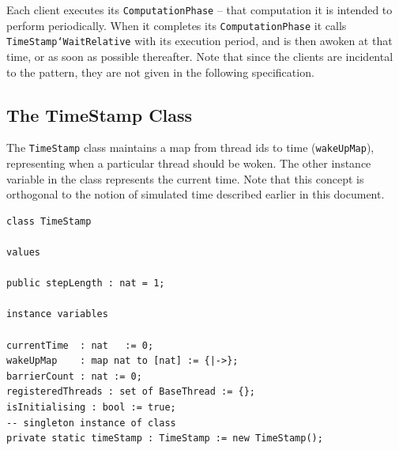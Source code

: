 \documentclass{overturerepchap}
\begin{document}
Each client executes its
\texttt{ComputationPhase} -- that computation it is intended to perform
periodically. When it completes its \texttt{ComputationPhase} it calls 
\texttt{TimeStamp`WaitRelative} with its
execution period, and is then awoken at that time, or as soon as
possible thereafter. Note that since the clients are incidental to the 
pattern, they are not given in the following specification.


\subsection{The TimeStamp Class}

The \texttt{TimeStamp} class maintains a map from thread ids to 
time (\texttt{wakeUpMap}), representing when a particular thread 
should be woken. The other instance variable in the class
represents the current time. Note that this concept is orthogonal to
the notion of simulated time described earlier in this document.



\begin{lstlisting}
class TimeStamp

values

public stepLength : nat = 1;

instance variables

currentTime  : nat   := 0;
wakeUpMap    : map nat to [nat] := {|->};
barrierCount : nat := 0;
registeredThreads : set of BaseThread := {};
isInitialising : bool := true;
-- singleton instance of class
private static timeStamp : TimeStamp := new TimeStamp();
\end{lstlisting}
\end{document}
